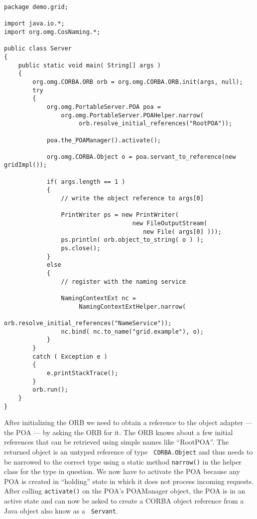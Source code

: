 \documentclass[12pt]{scrbook}
\begin{document}
\small{
\begin{verbatim}
package demo.grid;

import java.io.*;
import org.omg.CosNaming.*;

public class Server
{
    public static void main( String[] args )
    {
        org.omg.CORBA.ORB orb = org.omg.CORBA.ORB.init(args, null);
        try
        {
            org.omg.PortableServer.POA poa = 
                org.omg.PortableServer.POAHelper.narrow(
                     orb.resolve_initial_references("RootPOA"));
            
            poa.the_POAManager().activate();

            org.omg.CORBA.Object o = poa.servant_to_reference(new gridImpl());

            if( args.length == 1 ) 
            {
                // write the object reference to args[0]

                PrintWriter ps = new PrintWriter(
                                    new FileOutputStream(
                                       new File( args[0] )));
                ps.println( orb.object_to_string( o ) );
                ps.close();
            } 
            else
            {
                // register with the naming service             

                NamingContextExt nc = 
                     NamingContextExtHelper.narrow(
                        orb.resolve_initial_references("NameService"));
                nc.bind( nc.to_name("grid.example"), o);        
            }
        } 
        catch ( Exception e )
        {
            e.printStackTrace();
        }
        orb.run();
    }
}
\end{verbatim}
}

After initializing the ORB we need to obtain a reference to the object
adapter --- the POA --- by asking  the ORB for it. The ORB knows about
a few initial references that can be retrieved using simple names like
``RootPOA''. The returned object is  an untyped reference of type {\tt
CORBA.Object} and thus needs to  be narrowed to the correct type using
a static  method {\tt narrow()}  in the helper  class for the  type in
question. We now  have to activate the POA because  any POA is created
in  ``holding''   state  in  which   it  does  not   process  incoming
requests.  After  calling {\tt  activate()}  on  the POA's  POAManager
object, the POA is in an active state and can now be asked to create a
CORBA  object  reference  from a  Java  object  also  know as  a  {\tt
Servant}.
\end{document}
